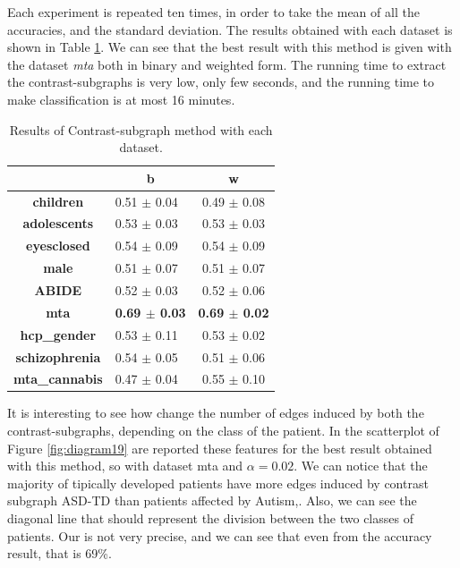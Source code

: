 Each experiment is repeated ten times, in order to take the mean of all the accuracies, and the standard deviation. The results obtained with each dataset is shown in Table \ref{tab:c-s}. We can see that the best result with this method is given with the dataset \textit{mta} both in binary and weighted form. The running time to extract the contrast-subgraphs is very low, only few seconds, and the running time to make classification is at most 16 minutes.
\vspace{0.5cm}
\begin{table}
	\centering
	\begin{tabular}{c|l|c} 
		\toprule
		& \multicolumn{1}{c|}{b} & w                \\ 
		\midrule
		\textbf{children}      & 0.51 $\pm$ 0.04        & 0.49 $\pm$ 0.08  \\
		\textbf{adolescents}   & 0.53 $\pm$ 0.03        & 0.53 $\pm$ 0.03  \\
		\textbf{eyesclosed}    & 0.54 $\pm$ 0.09        & 0.54 $\pm$ 0.09  \\
		\textbf{male}          & 0.51 $\pm$ 0.07        & 0.51 $\pm$ 0.07  \\
		\textbf{ABIDE}         & 0.52 $\pm$ 0.03        & 0.52 $\pm$ 0.06  \\
		\textbf{mta}           & \textbf{0.69 $\pm$ 0.03}        & \textbf{0.69 $\pm$ 0.02}  \\
		\textbf{hcp\_gender}   & 0.53 $\pm$ 0.11        & 0.53 $\pm$ 0.02  \\
		\textbf{schizophrenia} & 0.54 $\pm$ 0.05        & 0.51 $\pm$ 0.06  \\
		\textbf{mta\_cannabis} & 0.47 $\pm$ 0.04        & 0.55 $\pm$ 0.10 
	\end{tabular}
	\caption{Results of Contrast-subgraph method with each dataset.}
	\label{tab:c-s}
\end{table}

It is interesting to see how change the number of edges induced by both the contrast-subgraphs, depending on the class of the patient. In the scatterplot of Figure \ref{fig:diagram19} are reported these features for the best result obtained with this method, so with dataset mta and $ \alpha = 0.02 $. We can notice that the majority of tipically developed patients have more edges induced by contrast subgraph ASD-TD than patients affected by Autism,. Also, we can see the diagonal line that should represent the division between the two classes of patients. Our is not very precise, and we can see that even from the accuracy result, that is 69\%.

